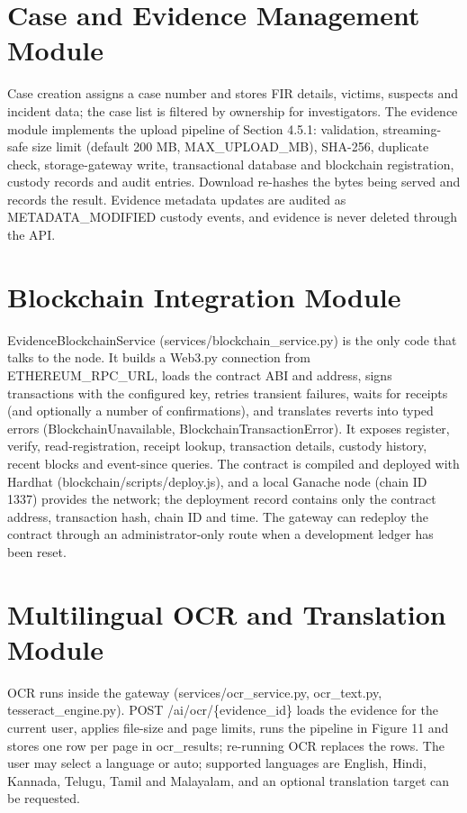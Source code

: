 \documentclass[12pt,a4paper,oneside]{report}
\newcommand{\code}[1]{{\small\ttfamily #1}}
\begin{document}
\section{Case and Evidence Management Module}
Case creation assigns a case number and stores FIR details, victims, suspects and incident data; the case list is filtered by ownership for investigators. The evidence module implements the upload pipeline of Section 4.5.1: validation, streaming-safe size limit (default 200 MB, \code{MAX\_\allowbreak{}UPLOAD\_\allowbreak{}MB}), SHA-256, duplicate check, storage-gateway write, transactional database and blockchain registration, custody records and audit entries. Download re-hashes the bytes being served and records the result. Evidence metadata updates are audited as METADATA\_MODIFIED custody events, and evidence is never deleted through the API.

\section{Blockchain Integration Module}
\code{EvidenceBlockchainService} (\code{services/\allowbreak{}blockchain\_\allowbreak{}service.py}) is the only code that talks to the node. It builds a Web3.py connection from \code{ETHEREUM\_\allowbreak{}RPC\_\allowbreak{}URL}, loads the contract ABI and address, signs transactions with the configured key, retries transient failures, waits for receipts (and optionally a number of confirmations), and translates reverts into typed errors (\code{BlockchainUnavailable}, \code{BlockchainTransactionError}). It exposes register, verify, read-registration, receipt lookup, transaction details, custody history, recent blocks and event-since queries. The contract is compiled and deployed with Hardhat (\code{blockchain/\allowbreak{}scripts/\allowbreak{}deploy.js}), and a local Ganache node (chain ID 1337) provides the network; the deployment record contains only the contract address, transaction hash, chain ID and time. The gateway can redeploy the contract through an administrator-only route when a development ledger has been reset.

\section{Multilingual OCR and Translation Module}
OCR runs inside the gateway (\code{services/\allowbreak{}ocr\_\allowbreak{}service.py}, \code{ocr\_\allowbreak{}text.py}, \code{tesseract\_\allowbreak{}engine.py}). \code{POST /\allowbreak{}ai/\allowbreak{}ocr/\allowbreak{}\{evidence\_\allowbreak{}id\}} loads the evidence for the current user, applies file-size and page limits, runs the pipeline in Figure 11 and stores one row per page in \code{ocr\_\allowbreak{}results}; re-running OCR replaces the rows. The user may select a language or \code{auto}; supported languages are English, Hindi, Kannada, Telugu, Tamil and Malayalam, and an optional translation target can be requested.
\end{document}
